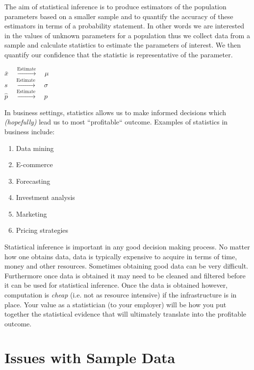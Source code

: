 The aim of statistical inference is to produce estimators of the population parameters based on a smaller sample and to
quantify the accuracy of these estimators in terms of a probability statement. 
In other words we are interested in the values of unknown parameters for a population thus we collect data from a sample and calculate statistics to estimate the parameters of interest. We then quantify our confidence that the statistic is representative of the parameter.

\begin{center}
$\bar{x}	\quad	\xrightarrow{\text{Estimate}}	\quad 	\mu$		\\[0.5em]
$s	 	\quad	\xrightarrow{\text{Estimate}}	\quad 	\sigma$	\\[0.5em]
$\hat{p}	\quad	\xrightarrow{\text{Estimate}}	\quad	p$
\end{center}

In business settings, statistics allows us to make informed decisions which \textit{(hopefully)} lead us to most ``profitable`` outcome.
Examples of statistics in business include:%

\begin{enumerate}
\item Data mining%
\item E-commerce%
\item Forecasting%
\item Investment analysis%
\item Marketing%
\item Pricing strategies%
\end{enumerate}



Statistical inference is important in any good decision making process. No matter how one obtains data, data is typically expensive to acquire in terms of time, money and other resources. Sometimes obtaining good data can be very difficult. Furthermore once data is obtained it may need to be cleaned and filtered before it can be used for statistical inference. Once the data is obtained however, 
computation is \textit{cheap} (i.e. not as resource intensive) if the infrastructure is in place. Your value as a statistician (to your employer) will be how you put together the statistical
evidence that will ultimately translate into the profitable outcome.

\section{Issues with Sample Data}


